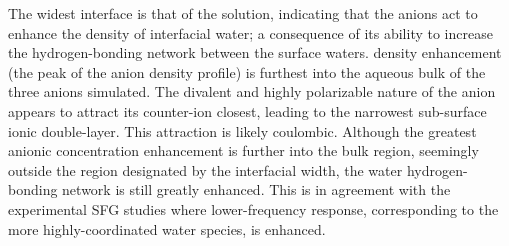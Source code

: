 The widest interface is that of the \sodsul solution, indicating that the \sul anions act to enhance the density of interfacial water; a consequence of its ability to increase the hydrogen-bonding network between the surface waters. \sul density enhancement (the peak of the anion density profile) is furthest into the aqueous bulk of the three anions simulated. The divalent and highly polarizable nature of the \sul anion appears to attract its counter-ion closest, leading to the narrowest sub-surface ionic double-layer. This attraction is likely coulombic. Although the greatest anionic concentration enhancement is further into the bulk region, seemingly outside the region designated by the interfacial width, the water hydrogen-bonding network is still greatly enhanced. This is in agreement with the experimental \sodsul SFG studies where lower-frequency response, corresponding to the more highly-coordinated water species, is enhanced.\cite{McFearin2009}

